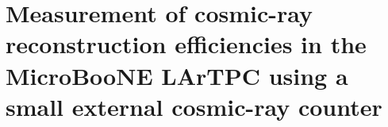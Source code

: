 
\chapter{Measurement of cosmic-ray reconstruction efficiencies in the MicroBooNE LArTPC using a small external cosmic-ray counter}\label{sec:mucs}

